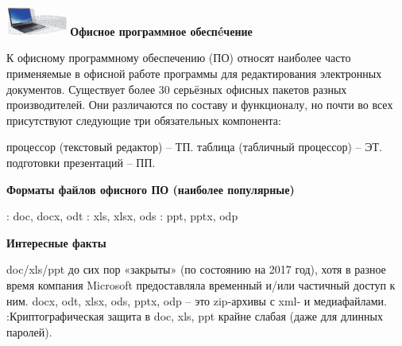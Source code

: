 \documentclass[aspectratio=169]{beamer}
\begin{document}
\begin{frame}
\Large
\includegraphics[width=2cm]{logo} {\bf Офисное программное обеспéчение}
\begin{flushleft}
\footnotesize
К офисному программному обеспечению (ПО) относят наиболее часто
применяемые в офисной работе программы для редактирования электронных документов.
Существует более 30 серьёзных офисных пакетов разных производителей. Они различаются по
составу и функционалу, но почти во всех присутствуют следующие три обязательных компонента:
\begin{itemize}
 процессор (текстовый редактор) – ТП.
 таблица (табличный процессор) – ЭТ.
 подготовки презентаций – ПП.
\end{itemize}
{\bf Форматы файлов офисного ПО (наиболее популярные)}
\begin{itemize}
: doc, docx, odt
: xls, xlsx, ods
: ppt, pptx, odp
\end{itemize}
{\bf Интересные факты}
\begin{itemize}
 doc/xls/ppt до сих пор «закрыты» (по состоянию на 2017 год), хотя в разное время
компания Microsoft предоставляла временный и/или частичный доступ к ним.
 docx, odt, xlsx, ods, pptx, odp – это zip-архивы с xml- и медиафайлами.
:Криптографическая защита в doc, xls, ppt крайне слабая (даже для длинных паролей).
\end{itemize}
\end{flushleft}
\end{frame}
\end{document}
